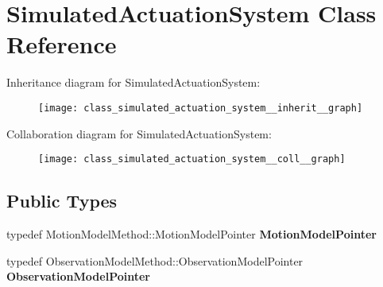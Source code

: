 \hypertarget{class_simulated_actuation_system}{\section{\-Simulated\-Actuation\-System \-Class \-Reference}
\label{class_simulated_actuation_system}
}


\-Inheritance diagram for \-Simulated\-Actuation\-System\-:\nopagebreak
\begin{figure}[H]
\begin{center}
\leavevmode
\texttt{[image: class\_simulated\_actuation\_system\_\_inherit\_\_graph]}
\end{center}
\end{figure}


\-Collaboration diagram for \-Simulated\-Actuation\-System\-:\nopagebreak
\begin{figure}[H]
\begin{center}
\leavevmode
\texttt{[image: class\_simulated\_actuation\_system\_\_coll\_\_graph]}
\end{center}
\end{figure}
\subsection*{\-Public \-Types}
\begin{DoxyCompactItemize}
\item 
\hypertarget{class_simulated_actuation_system_a4026d1ead324f05d1c1743024c60d73d}{typedef \*
\-Motion\-Model\-Method\-::\-Motion\-Model\-Pointer {\bfseries \-Motion\-Model\-Pointer}}\label{class_simulated_actuation_system_a4026d1ead324f05d1c1743024c60d73d}

\item 
\hypertarget{class_simulated_actuation_system_a34ed448bdae153ec4719dfc48156be3c}{typedef \*
\-Observation\-Model\-Method\-::\-Observation\-Model\-Pointer {\bfseries \-Observation\-Model\-Pointer}}\label{class_simulated_actuation_system_a34ed448bdae153ec4719dfc48156be3c}

\end{DoxyCompactItemize}
